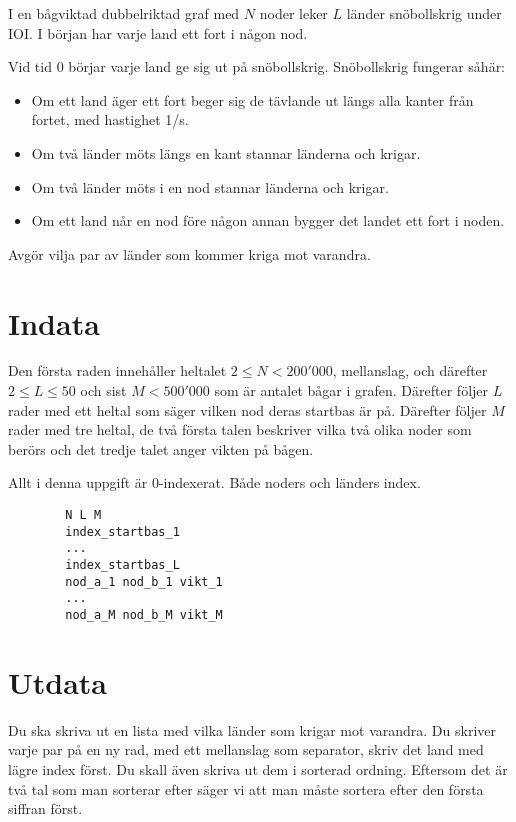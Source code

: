 
I en bågviktad dubbelriktad graf med $N$ noder leker $L$ länder snöbollskrig under IOI. I
början har varje land ett fort i någon nod.

Vid tid $0$ börjar varje land ge sig ut på snöbollskrig. Snöbollskrig fungerar såhär:

\begin{itemize}
\item Om ett land äger ett fort beger sig de tävlande ut längs alla kanter från fortet, med hastighet 1/s.
\item Om två länder möts längs en kant stannar länderna och krigar.
\item Om två länder möts i en nod stannar länderna och krigar.
\item Om ett land når en nod före någon annan bygger det landet ett fort i noden.
\end{itemize}

Avgör vilja par av länder som kommer kriga mot varandra.

\section*{Indata}

Den första raden innehåller heltalet $2 \le N < 200'000$, mellanslag, och
därefter $2 \le L \le 50$ och sist $M < 500'000$ som är antalet bågar i
grafen. Därefter följer $L$ rader med ett heltal som säger vilken nod deras
startbas är på. Därefter följer $M$ rader med tre heltal, de två första talen
beskriver vilka två olika noder som berörs och det tredje talet anger vikten på
bågen.

Allt i denna uppgift är 0-indexerat. Både noders och länders index.

\begin{lstlisting}
        N L M
        index_startbas_1
        ...
        index_startbas_L
        nod_a_1 nod_b_1 vikt_1
        ...
        nod_a_M nod_b_M vikt_M
\end{lstlisting}

\section*{Utdata}

Du ska skriva ut en lista med vilka länder som krigar mot varandra. Du skriver
varje par på en ny rad, med ett mellanslag som separator, skriv det land med
lägre index först. Du skall även skriva ut dem i sorterad ordning. Eftersom det
är två tal som man sorterar efter säger vi att man måste sortera efter den
första siffran först. 

